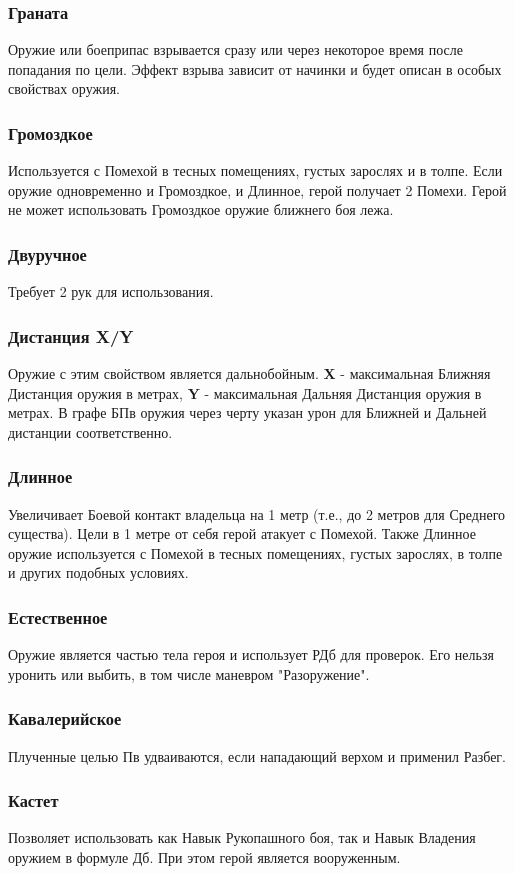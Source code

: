 \subsubsection{Граната} Оружие или боеприпас взрывается сразу или через некоторое время после попадания по цели. Эффект взрыва зависит от начинки и будет описан в особых свойствах оружия.
\subsubsection{Громоздкое} Используется с Помехой в тесных помещениях, густых зарослях и в толпе. Если оружие одновременно и Громоздкое, и Длинное, герой получает 2 Помехи. Герой не может использовать Громоздкое оружие ближнего боя лежа.
\subsubsection{Двуручное} Требует 2 рук для использования.
\subsubsection{Дистанция X/Y} Оружие с этим свойством является дальнобойным. \textbf{X} - максимальная Ближняя Дистанция оружия в метрах, \textbf{Y} - максимальная Дальняя Дистанция оружия в метрах. В графе БПв оружия через черту указан урон для Ближней и Дальней дистанции соответственно.
\subsubsection{Длинное} Увеличивает Боевой контакт владельца на 1 метр (т.е., до 2 метров для Среднего существа). Цели в 1 метре от себя герой атакует с Помехой. Также Длинное оружие используется с Помехой в тесных помещениях, густых зарослях, в толпе и других подобных условиях.
\subsubsection{Естественное} Оружие является частью тела героя и использует РДб для проверок. Его нельзя уронить или выбить, в том числе маневром "Разоружение".
\subsubsection{Кавалерийское} Плученные целью Пв удваиваются, если нападающий верхом и применил Разбег.
\subsubsection{Кастет} Позволяет использовать как Навык Рукопашного боя, так и Навык Владения оружием в формуле Дб. При этом герой является вооруженным.
